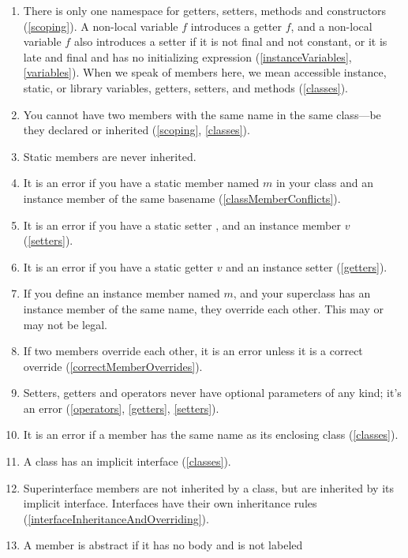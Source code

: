 \documentclass[makeidx]{article}
\begin{document}
{  \begin{enumerate}
  \item There is only one namespace
    for getters, setters, methods and constructors (\ref{scoping}).
    A non-local variable $f$ introduces a getter $f$,
    and a non-local variable $f$
    also introduces a setter
    if it is not final and not constant,
    or it is late and final and has no initializing expression
     (\ref{instanceVariables}, \ref{variables}).
    When we speak of members here, we mean
    accessible instance, static, or library variables,
    getters, setters, and methods
    (\ref{classes}).
  \item You cannot have two members with the same name in the same class---be
    they declared or inherited (\ref{scoping}, \ref{classes}).
  \item Static members are never inherited.
  \item It is an error if you have a static member named $m$ in your class
    and an instance member of the same basename
    (\ref{classMemberConflicts}).
  \item It is an error if you have a static setter ,
    and an instance member $v$ (\ref{setters}).
  \item It is an error if you have a static getter $v$
    and an instance setter  (\ref{getters}).
  \item If you define an instance member named $m$,
    and your superclass has an instance member of the same name,
    they override each other.
    This may or may not be legal.
  \item \label{typeSigAssignable}
    If two members override each other,
    it is an error unless it is a correct override
    (\ref{correctMemberOverrides}).
  \item Setters, getters and operators never have
    optional parameters of any kind;
    it's an error (\ref{operators}, \ref{getters}, \ref{setters}).
  \item
    It is an error if a member has the same name as its enclosing class
    (\ref{classes}).
  \item A class has an implicit interface (\ref{classes}).
  \item Superinterface members are not inherited by a class,
    but are inherited by its implicit interface.
    Interfaces have their own inheritance rules
    (\ref{interfaceInheritanceAndOverriding}).
  \item A member is abstract if
    it has no body and is not labeled \EXTERNAL{}

\end{enumerate}}
\end{document}
